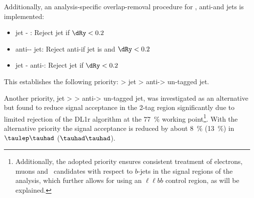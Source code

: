 Additionally, an analysis-specific overlap-removal procedure for \tauhadvis,
anti-\tauhadvis and jets is implemented:
\begin{itemize}
\item jet - \tauhadvis: Reject jet if $\dRy < 0.2$
\item anti-\tauhadvis - jet: Reject anti-\tauhad if jet is \btagged and $\dRy <
  0.2$
\item jet - anti-\tauhadvis: Reject jet  if $\dRy < 0.2$
\end{itemize}
This establishes the following priority: \tauhadvis > \btagged jet >
anti-\tauhadvis > un-tagged jet.

Another priority, \btagged jet > \tauhadvis > anti-\tauhadvis > un-tagged jet, was
investigated as an alternative but found to reduce signal acceptance in the
2-tag region significantly due to limited \tauhad rejection of the DL1r \btag
algorithm at the \SI{77}{\percent} working point\footnote{Additionally, the adopted priority
ensures consistent treatment of electrons, muons and \tauhadvis\ candidates
with respect to $b$-jets in the signal regions of the analysis, which 
further allows for using an $\ell\ell bb$ control region, as will be explained.}. 
With the alternative priority
the signal acceptance is reduced by about \SI{8}{\percent} (\SI{13}{\percent})
in $\taulep\tauhad$ ($\tauhad\tauhad$).
